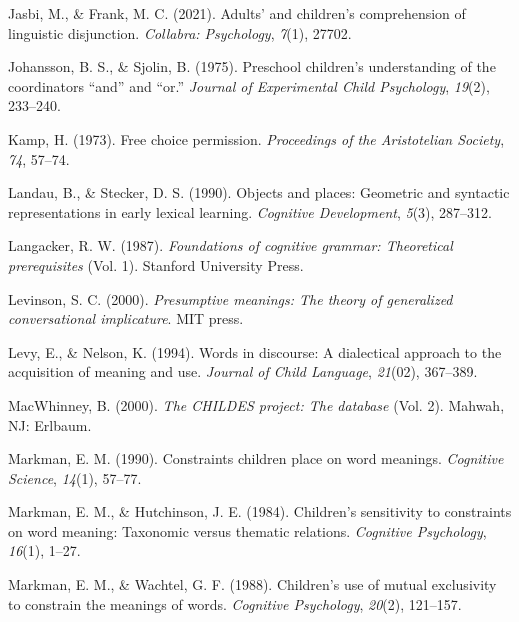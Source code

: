\documentclass[
  ,man,floatsintext]{apa6}
\newlength{\cslhangindent}
\newlength{\cslentryspacingunit} %
\newenvironment{CSLReferences}[2] %
 {%
  \setlength{\parindent}{0pt}
  \ifodd #1
  \let\oldpar\par
  \def\par{\hangindent=\cslhangindent\oldpar}
  \fi
  \setlength{\parskip}{#2\cslentryspacingunit}
 }%
 {}
\begin{document}
\begin{CSLReferences}{1}{0}
\leavevmode{}%
Jasbi, M., \& Frank, M. C. (2021). Adults' and children's comprehension of linguistic disjunction. \emph{Collabra: Psychology}, \emph{7}(1), 27702.

\leavevmode{}%
Johansson, B. S., \& Sjolin, B. (1975). Preschool children's understanding of the coordinators {``and''} and {``or.''} \emph{Journal of Experimental Child Psychology}, \emph{19}(2), 233--240.

\leavevmode{}%
Kamp, H. (1973). Free choice permission. \emph{Proceedings of the {A}ristotelian Society}, \emph{74}, 57--74.

\leavevmode{}%
Landau, B., \& Stecker, D. S. (1990). Objects and places: Geometric and syntactic representations in early lexical learning. \emph{Cognitive Development}, \emph{5}(3), 287--312.

\leavevmode{}%
Langacker, R. W. (1987). \emph{Foundations of cognitive grammar: Theoretical prerequisites} (Vol. 1). {S}tanford {U}niversity {P}ress.

\leavevmode{}%
Levinson, S. C. (2000). \emph{Presumptive meanings: The theory of generalized conversational implicature}. MIT press.

\leavevmode{}%
Levy, E., \& Nelson, K. (1994). Words in discourse: A dialectical approach to the acquisition of meaning and use. \emph{Journal of Child Language}, \emph{21}(02), 367--389.

\leavevmode{}%
MacWhinney, B. (2000). \emph{The {CHILDES} project: The database} (Vol. 2). Mahwah, NJ: Erlbaum.

\leavevmode{}%
Markman, E. M. (1990). Constraints children place on word meanings. \emph{Cognitive Science}, \emph{14}(1), 57--77.

\leavevmode{}%
Markman, E. M., \& Hutchinson, J. E. (1984). Children's sensitivity to constraints on word meaning: Taxonomic versus thematic relations. \emph{Cognitive Psychology}, \emph{16}(1), 1--27.

\leavevmode{}%
Markman, E. M., \& Wachtel, G. F. (1988). Children's use of mutual exclusivity to constrain the meanings of words. \emph{Cognitive Psychology}, \emph{20}(2), 121--157.


\end{CSLReferences}
\end{document}
